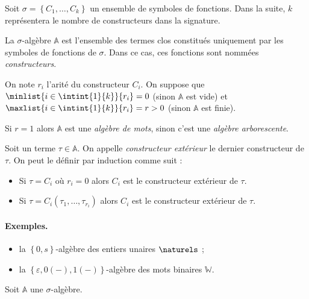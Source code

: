 \documentclass{report}
\newcommand{\bbA}{\mathbb{A}}
\begin{document}
		\begin{definition}
			\label{def:algebre}
			Soit $\sigma = \left\lbrace C_1, \dots, C_k \right\rbrace$ un ensemble de symboles de fonctions. Dans la suite, $k$ représentera le nombre de constructeurs dans la signature.
			
			La $\sigma$-algèbre $\bbA$ est l'ensemble des termes clos constitués uniquement par les symboles de fonctions de $\sigma$. Dans ce cas, ces fonctions sont nommées \emph{constructeurs}. 
			
			On note $r_i$ l'arité du constructeur $C_i$. On suppose que $\minlist{i\in\intint{1}{k}}{r_i} = 0$ (sinon $\bbA$ est vide) et $\maxlist{i\in\intint{1}{k}}{r_i} = r > 0$ (sinon $\bbA$ est finie).
			
			Si $r = 1$ alors $\mathbb{A}$ est une \emph{algèbre de mots}, sinon c'est une \emph{algèbre arborescente}.
			
			Soit un terme $\tau \in \bbA$. On appelle \emph{constructeur extérieur} le dernier constructeur de $\tau$. On peut le définir par induction comme suit :
			
			\begin{itemize}[itemsep=-1mm]
				\item 	Si $\tau = C_i$ où $r_i = 0$ alors $C_i$ est le constructeur extérieur de $\tau$.
				\item 	Si $\tau = C_i(\tau_1, \dots, \tau_{r_i})$ alors $C_{i}$ est le constructeur extérieur de $\tau$.
			\end{itemize}
		\end{definition}
		
		
			\paragraph{Exemples.}
			\begin{itemize}[itemsep=-1mm]
				\item 	la $\left\lbrace 0, s \right\rbrace$-algèbre des entiers unaires $\naturels$ ;
				\item 	la $\left\lbrace \varepsilon, 0(-), 1(-)\right\rbrace$-algèbre des mots binaires $\mathbb{W}$.
			\end{itemize}
			
			\espace
		
		Soit $\bbA$ une $\sigma$-algèbre. 
		
\end{document}
